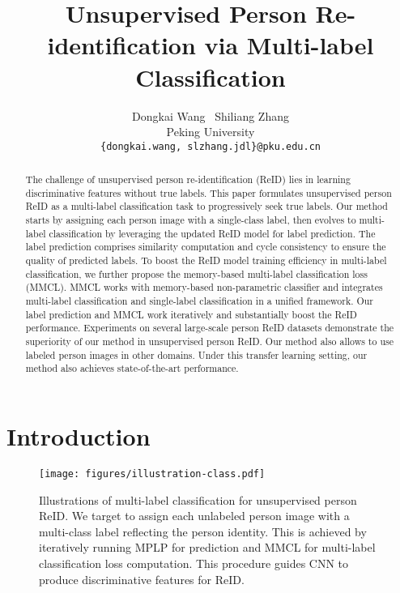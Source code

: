 \documentclass[10pt,twocolumn,letterpaper]{article}
\begin{document}
\title{Unsupervised Person Re-identification via Multi-label Classification}

\author{Dongkai Wang \ \quad Shiliang Zhang\\
Peking University\\
{\tt\footnotesize \{dongkai.wang, slzhang.jdl\}@pku.edu.cn}
}

\maketitle
\thispagestyle{empty}

\begin{abstract}
   The challenge of unsupervised person re-identification (ReID) lies in learning discriminative features without true labels. This paper formulates unsupervised person ReID as a multi-label classification task to progressively seek true labels. Our method starts by assigning each person image with a single-class label, then evolves to multi-label classification by leveraging the updated ReID model for label prediction. The label prediction comprises similarity computation and cycle consistency to ensure the quality of predicted labels. To boost the ReID model training efficiency in multi-label classification, we further propose the memory-based multi-label classification loss (MMCL). MMCL works with memory-based non-parametric classifier and integrates multi-label classification and single-label classification in a unified framework. Our label prediction and MMCL work iteratively and substantially boost the ReID performance. Experiments on several large-scale person ReID datasets demonstrate the superiority of our method in unsupervised person ReID. Our method also allows to use labeled person images in other domains. Under this transfer learning setting, our method also achieves state-of-the-art performance.
\end{abstract}

\section{Introduction}
\begin{figure}
\begin{center}
\texttt{[image: figures/illustration-class.pdf]}
\end{center}
\caption{Illustrations of multi-label classification for unsupervised person ReID. We target to assign each unlabeled person image with a multi-class label reflecting the person identity. This is achieved by iteratively running MPLP for prediction and MMCL for multi-label classification loss computation. This procedure guides CNN to produce discriminative features for ReID.}
\label{fig:idea}
\end{figure}
\end{document}
